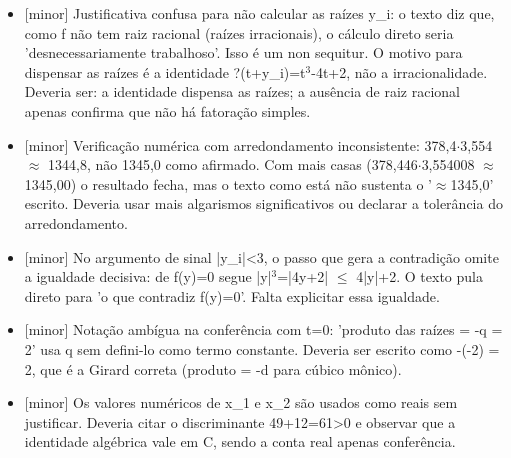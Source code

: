 \documentclass{article}%
\begin{document}
\begin{itemize}%
\item%
{[}minor{]} Justificativa confusa para não calcular as raízes y\_i: o texto diz que, como f não tem raiz racional (raízes irracionais), o cálculo direto seria 'desnecessariamente trabalhoso'. Isso é um non sequitur. O motivo para dispensar as raízes é a identidade ?(t+y\_i)=t$^3$-4t+2, não a irracionalidade. Deveria ser: a identidade dispensa as raízes; a ausência de raiz racional apenas confirma que não há fatoração simples.%
\item%
{[}minor{]} Verificação numérica com arredondamento inconsistente: 378,4$\cdot$3,554 $\approx$ 1344,8, não 1345,0 como afirmado. Com mais casas (378,446$\cdot$3,554008 $\approx$ 1345,00) o resultado fecha, mas o texto como está não sustenta o '$\approx$1345,0' escrito. Deveria usar mais algarismos significativos ou declarar a tolerância do arredondamento.%
\item%
{[}minor{]} No argumento de sinal |y\_i|<3, o passo que gera a contradição omite a igualdade decisiva: de f(y)=0 segue |y|$^3$=|4y+2| $\leq$ 4|y|+2. O texto pula direto para 'o que contradiz f(y)=0'. Falta explicitar essa igualdade.%
\item%
{[}minor{]} Notação ambígua na conferência com t=0: 'produto das raízes = -q = 2' usa q sem defini{-}lo como termo constante. Deveria ser escrito como -(-2) = 2, que é a Girard correta (produto = -d para cúbico mônico).%
\item%
{[}minor{]} Os valores numéricos de x\_1 e x\_2 são usados como reais sem justificar. Deveria citar o discriminante 49+12=61>0 e observar que a identidade algébrica vale em C, sendo a conta real apenas conferência.%
\end{itemize}%
\end{document}
